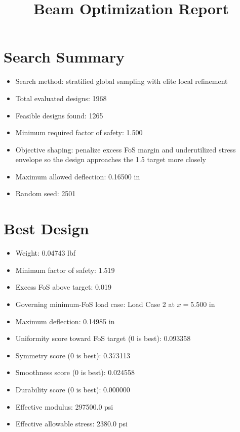 \documentclass[11pt]{article}
\title{Beam Optimization Report}
\date{}
\begin{document}
\maketitle

\section*{Search Summary}
\begin{itemize}
\item Search method: stratified global sampling with elite local refinement
\item Total evaluated designs: 1968
\item Feasible designs found: 1265
\item Minimum required factor of safety: 1.500
\item Objective shaping: penalize excess FoS margin and underutilized stress envelope so the design approaches the 1.5 target more closely
\item Maximum allowed deflection: 0.16500 in
\item Random seed: 2501
\end{itemize}

\section*{Best Design}
\begin{itemize}
\item Weight: 0.04743 lbf
\item Minimum factor of safety: 1.519
\item Excess FoS above target: 0.019
\item Governing minimum-FoS load case: Load Case 2 at $x=5.500$ in
\item Maximum deflection: 0.14985 in
\item Uniformity score toward FoS target (0 is best): 0.093358
\item Symmetry score (0 is best): 0.373113
\item Smoothness score (0 is best): 0.024558
\item Durability score (0 is best): 0.000000
\item Effective modulus: 297500.0 psi
\item Effective allowable stress: 2380.0 psi
\end{itemize}
\end{document}
